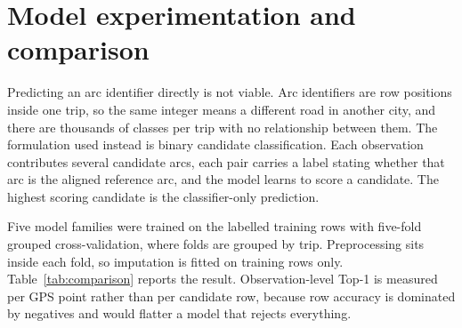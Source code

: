 \documentclass[11pt,a4paper]{article}
\begin{document}
\section{Model experimentation and comparison}

Predicting an arc identifier directly is not viable. Arc identifiers are row positions inside one
trip, so the same integer means a different road in another city, and there are thousands of classes
per trip with no relationship between them. The formulation used instead is binary candidate
classification. Each observation contributes several candidate arcs, each pair carries a label
stating whether that arc is the aligned reference arc, and the model learns to score a candidate. The
highest scoring candidate is the classifier-only prediction.

Five model families were trained on the labelled training rows with five-fold grouped
cross-validation, where folds are grouped by trip. Preprocessing sits inside each fold, so imputation
is fitted on training rows only. Table~\ref{tab:comparison} reports the result. Observation-level
Top-1 is measured per GPS point rather than per candidate row, because row accuracy is dominated by
negatives and would flatter a model that rejects everything.

\begin{table}[H]
\centering
\caption{Comparison of the five models. Cross-validation uses five folds grouped by trip and every
student-test score comes from the ten development trips, which were never used for fitting. Route
continuity is measured on the classifier's sequence of best candidates, because the decoder is shared
by all five models; its own continuity is reported in Section~\ref{sec:hmm}. Inference time is the
fastest of three prediction passes over the student-test candidates.}
\label{tab:comparison}
\footnotesize
{}
\end{table}
\end{document}
